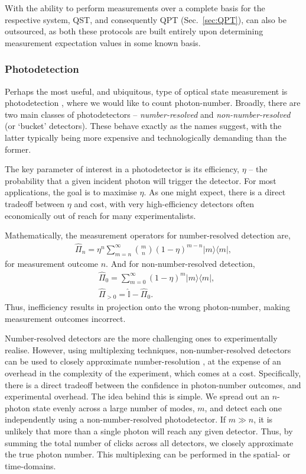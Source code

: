 \documentclass[aps,rmp,twocolumn,amsmath,amssymb,nofootinbib,superscriptaddress,longbibliography,floatfix]{revtex4-1}
\newcommand{\bra}[1]{\langle#1|}
\newcommand{\ket}[1]{|#1\rangle}
\begin{document}
With the ability to perform measurements over a complete basis for the respective system, QST, and consequently QPT (Sec.~\ref{sec:QPT}), can also be outsourced, as both these protocols are built entirely upon determining measurement expectation values in some known basis.

%
%

\subsubsection{Photodetection}

Perhaps the most useful, and ubiquitous, type of optical state measurement is photodetection \cite{RohdePDReview}, where we would like to count photon-number. Broadly, there are two main classes of photodetectors -- \emph{number-resolved} and \emph{non-number-resolved} (or `bucket' detectors). These behave exactly as the names suggest, with the latter typically being more expensive and technologically demanding than the former.

The key parameter of interest in a photodetector is its efficiency, $\eta$ -- the probability that a given incident photon will trigger the detector. For most applications, the goal is to maximise $\eta$. As one might expect, there is a direct tradeoff between $\eta$ and cost, with very high-efficiency detectors often economically out of reach for many experimentalists.

Mathematically, the measurement operators for number-resolved detection are,
\begin{align}
\hat\Pi_n = \eta^{n} \sum_{m=n}^\infty \binom{m}{n} (1-\eta)^{m-n} \ket{m}\bra{m},
\end{align}
for measurement outcome $n$. And for non-number-resolved detection,
\begin{align}
&\hat\Pi_0 = \sum_{m=0}^\infty (1-\eta)^{m} \ket{m}\bra{m}, \nonumber \\
&\hat\Pi_{>0} = \mathbb{\hat{I}} - \hat\Pi_0.
\end{align}
Thus, inefficiency results in projection onto the wrong photon-number, making measurement outcomes incorrect.

Number-resolved detectors are the more challenging ones to experimentally realise. However, using multiplexing techniques, non-number-resolved detectors can be used to closely approximate number-resolution \cite{bib:Fitch03, bib:Banaszek03, bib:Achilles04, bib:RohdeCompDet07}, at the expense of an overhead in the complexity of the experiment, which comes at a cost. Specifically, there is a direct tradeoff between the confidence in photon-number outcomes, and experimental overhead. The idea behind this is simple. We spread out an $n$-photon state evenly across a large number of modes, $m$, and detect each one independently using a non-number-resolved photodetector. If \mbox{$m\gg n$}, it is unlikely that more than a single photon will reach any given detector. Thus, by summing the total number of clicks across all detectors, we closely approximate the true photon number. This multiplexing can be performed in the spatial- or time-domains.
\end{document}
